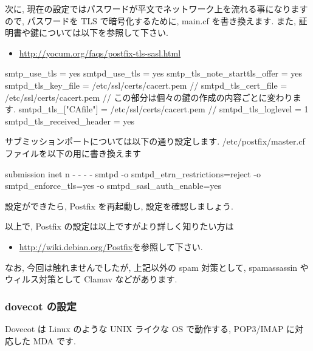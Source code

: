 \documentclass[mingoth,a4paper]{jsarticle}
\begin{document}
次に, 現在の設定ではパスワードが平文でネットワーク上を流れる事になりますので, パスワードを TLS で暗号化するために, main.cf を書き換えます. また, 証明書や鍵については以下を参照して下さい.
\begin{itemize}
\item \url{http://yocum.org/faqs/postfix-tls-sasl.html}
\end{itemize}
\begin{commandline}
smtp_use_tls = yes
smtpd_use_tls = yes 
smtp_tls_note_starttls_offer = yes 
smtpd_tls_key_file = /etc/ssl/certs/cacert.pem   //
smtpd_tls_cert_file = /etc/ssl/certs/cacert.pem  // この部分は個々の鍵の作成の内容ごとに変わります.
smtpd_tls_["CAfile"] = /etc/ssl/certs/cacert.pem //
smtpd_tls_loglevel = 1
smtpd_tls_received_header = yes
\end{commandline}

サブミッションポートについては以下の通り設定します. /etc/postfix/master.cf ファイルを以下の用に書き換えます
\begin{commandline}
submission inet n      -       -       -       -       smtpd
        -o smtpd_etrn_restrictions=reject
        -o smtpd_enforce_tls=yes 
        -o smtpd_sasl_auth_enable=yes
\end{commandline}
設定ができたら, Postfix を再起動し, 設定を確認しましょう.
以上で, Postfix の設定は以上ですがより詳しく知りたい方は
\begin{itemize}
\item \url{http://wiki.debian.org/Postfix}を参照して下さい.
\end{itemize}

なお, 今回は触れませんでしたが, 上記以外の spam 対策として, spamassassin やウィルス対策として Clamav などがあります.

\subsubsection{dovecot の設定}
Dovecot は Linux のような UNIX ライクな OS で動作する, POP3/IMAP に対応した MDA です.
\end{document}
